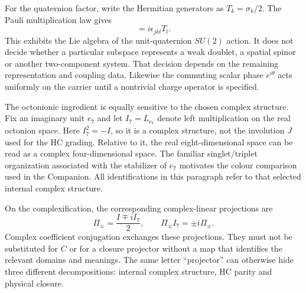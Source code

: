 For the quaternion factor, write the Hermitian generators as
$T_k=\sigma_k/2$. The Pauli multiplication law gives
\begin{equation}
 [T_j,T_k]=i\epsilon_{jkl}T_l.
\end{equation}
This exhibits the Lie algebra of the unit-quaternion $SU(2)$ action.
It does not decide whether a particular subspace represents a weak
doublet, a spatial spinor or another two-component system. That
decision depends on the remaining representation and coupling data.
Likewise the commuting scalar phase $e^{i\theta}$ acts uniformly on
the carrier until a nontrivial charge operator is specified.

The octonionic ingredient is equally sensitive to the chosen complex
structure. Fix an imaginary unit $e_7$ and let $I_7=L_{e_7}$ denote
left multiplication on the real octonion space. Here $I_7^2=-I$,
so it is a complex structure, not the involution $J$ used for the HC
grading. Relative to it, the real eight-dimensional space can be
read as a complex four-dimensional space. The familiar singlet/triplet
organization associated with the stabilizer of $e_7$ motivates the
colour comparison used in the Companion. All identifications in this
paragraph refer to that selected internal complex structure.

On the complexification, the corresponding complex-linear projections
are
\begin{equation}
 \Pi_\pm=\frac{I\mp iI_7}{2},\qquad
 \Pi_\pm I_7=\pm i\Pi_\pm.
\end{equation}
Complex coefficient conjugation exchanges these projections. They
must not be substituted for $C$ or for a closure projector without
a map that identifies the relevant domains and meanings. The same
letter ``projector'' can otherwise hide three different decompositions:
internal complex structure, HC parity and physical closure.

